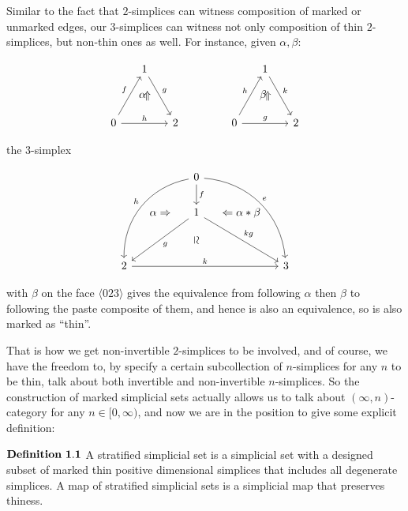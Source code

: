 \documentclass[11pt]{article}
\newcommand{\vsimeq}{\rotatebox[origin=c]{-90}{$\simeq$}}
\newcommand{\vRightarrow}{\rotatebox[origin=c]{90}{$\Rightarrow$}}
\begin{document}
Similar to the fact that $2$-simplices can witness composition of marked or unmarked edges, our $3$-simplices can witness not only composition of thin $2$-simplices, but non-thin ones as well. For instance, given $\alpha,\beta$:


$$
\begin{tikzcd}[column sep=small, row sep=small]
& 1 \arrow{rdd}{g} \\
& \alpha\vRightarrow \\
0 \arrow{uur}{f} \arrow{rr}{h} &  & 2
\end{tikzcd}
 \hspace{40pt}
\begin{tikzcd}[column sep=small, row sep=small]
& 1 \arrow{rdd}{k} \\
& \beta\vRightarrow \\
0 \arrow{uur}{h} \arrow{rr}{g} &  & 2
\end{tikzcd}
$$


the $3$-simplex

\begin{equation*}
\begin{tikzcd}[column sep=small, row sep=small]
& & 0 \arrow{dd}{f}\arrow[swap,bend right=40]{ddddll}{h} \arrow[bend left=40]{ddddrr}{e} \\
\\
& \alpha\Rightarrow & 1\arrow{ddll}{g} \arrow{ddrr}{kg} & \Leftarrow\alpha\ast\beta \\
& & \vsimeq \\
2 \arrow{rrrr}{k} & & & & 3
\end{tikzcd}
\end{equation*}


with $\beta$ on the face $\langle 023\rangle$ gives the equivalence from following $\alpha$ then $\beta$ to following the paste composite of them, and hence is also an equivalence, so is also marked as ``thin''. 

That is how we get non-invertible $2$-simplices to be involved, and of course, we have the freedom to, by specify a certain subcollection of $n$-simplices for any $n$ to be thin, talk about both invertible and non-invertible $n$-simplices. So the construction of marked simplicial sets actually allows us to talk about $(\infty,n)$-category for any $n\in [0,\infty)$, and now we are in the position to give some explicit definition:

$\bf Definition \ 1.1$ A stratified simplicial set is a simplicial set with a designed subset of marked thin positive dimensional simplices that includes all degenerate simplices. A map of stratified simplicial sets is a simplicial map that preserves thiness.
\end{document}
